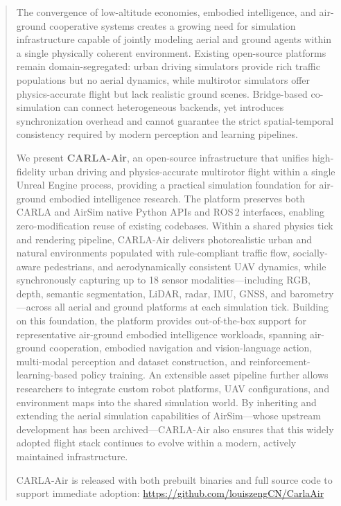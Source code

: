 
\begin{abstract}
The convergence of low-altitude economies, embodied intelligence, and
air-ground cooperative systems creates a growing need for simulation
infrastructure capable of jointly modeling aerial and ground agents within a
single physically coherent environment.
Existing open-source platforms remain domain-segregated: urban driving
simulators provide rich traffic populations but no aerial dynamics, while
multirotor simulators offer physics-accurate flight but lack realistic ground
scenes.
Bridge-based co-simulation can connect heterogeneous backends, yet introduces
synchronization overhead and cannot guarantee the strict spatial-temporal
consistency required by modern perception and learning pipelines.

We present \textbf{CARLA-Air}, an open-source infrastructure that unifies
high-fidelity urban driving and physics-accurate multirotor flight within a
single Unreal Engine process, providing a practical simulation foundation for
air-ground embodied intelligence research.
The platform preserves both CARLA and AirSim native Python APIs and
ROS\,2 interfaces, enabling zero-modification reuse of existing codebases.
Within a shared physics tick and rendering pipeline, CARLA-Air delivers
photorealistic urban and natural environments populated with rule-compliant
traffic flow, socially-aware pedestrians, and aerodynamically consistent UAV
dynamics, while synchronously capturing up to 18 sensor modalities---including
RGB, depth, semantic segmentation, LiDAR, radar, IMU, GNSS, and
barometry---across all aerial and ground platforms at each simulation tick.
Building on this foundation, the platform provides out-of-the-box support for
representative air-ground embodied intelligence workloads, spanning air-ground
cooperation, embodied navigation and vision-language action, multi-modal
perception and dataset construction, and reinforcement-learning-based policy
training.
An extensible asset pipeline further allows researchers to integrate custom
robot platforms, UAV configurations, and environment maps into the shared
simulation world.
By inheriting and extending the aerial simulation capabilities of
AirSim---whose upstream development has been archived---CARLA-Air also ensures
that this widely adopted flight stack continues to evolve within a modern,
actively maintained infrastructure.

CARLA-Air is released with both prebuilt binaries and full source code to
support immediate adoption:
\url{https://github.com/louiszengCN/CarlaAir}
\end{abstract}